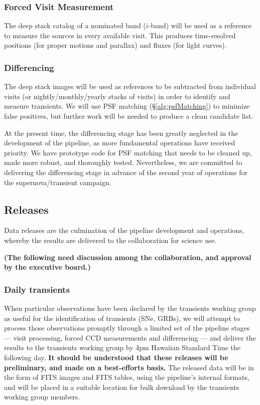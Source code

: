 \documentclass[12pt]{article}
\newcommand\tbd[1]{\textbf{\color{red}(#1)}}
\begin{document}
\subsubsection{Forced Visit Measurement}

The deep stack catalog of a nominated band ($i$-band) will be used as a reference to measure the sources in
every available visit.  This produces time-resolved positions (for proper motions and parallax) and fluxes
(for light curves).


\subsubsection{Differencing}

The deep stack images will be used as references to be subtracted from individual visits (or
nightly/monthly/yearly stacks of visits) in order to identify and measure transients.  We will use PSF matching
(\S\ref{alg:psfMatching}) to minimize false positives, but further work will be needed to produce a clean
candidate list.

At the present time, the differencing stage has been greatly neglected in the development of the pipeline, as
more fundamental operations have received priority.  We have prototype code for PSF matching that needs to be
cleaned up, made more robust, and thoroughly tested.  Nevertheless, we are committed to delivering the
differencing stage in advance of the second year of operations for the supernova/transient campaign.


\subsection{Releases}

Data releases are the culmination of the pipeline development and operations, whereby the results are delivered
to the collaboration for science use.

\tbd{The following need discussion among the collaboration, and approval by the executive board.}

\subsubsection{Daily transients}

When particular observations have been declared by the transients working group as useful for the
identification of transients (SNe, GRBs), we will attempt to process those observations promptly through a
limited set of the pipeline stages --- visit processing, forced CCD measurements and differencing --- and
deliver the results to the transients working group by 4pm Hawaiian Standard Time the following day.  {\bf It
  should be understood that these releases will be preliminary, and made on a best-efforts basis.}  The
released data will be in the form of FITS images and FITS tables, using the pipeline's internal formats, and
will be placed in a suitable location for bulk download by the transients working group members.
\end{document}

